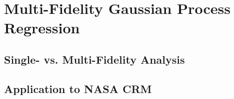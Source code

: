\chapter{Multi-Fidelity Gaussian Process Regression}







\section{Single- vs. Multi-Fidelity Analysis}

\section{Application to NASA CRM}
